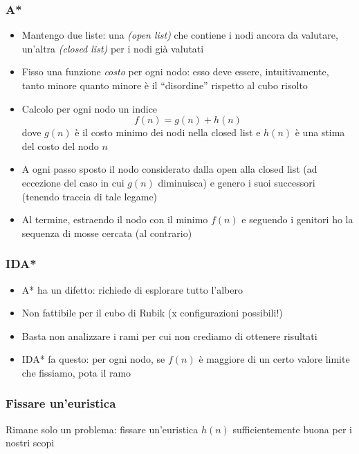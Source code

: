 \documentclass{beamer}
\begin{document}
\begin{frame}
\frametitle{A*}
\begin{itemize}
\item Mantengo due liste: una \emph{(open list)} che contiene i nodi ancora da
valutare, un'altra \emph{(closed list)} per i nodi già valutati
\item Fisso una funzione \emph{costo} per ogni nodo: esso deve essere,
intuitivamente, tanto minore quanto minore è il ``disordine'' rispetto al cubo
risolto
\item Calcolo per ogni nodo un indice
\[
f(n) = g(n) + h(n)
\]
dove $g(n)$ è il costo minimo dei nodi nella closed list e $h(n)$ è una stima
del costo del nodo $n$
\item A ogni passo sposto il nodo considerato dalla open alla closed list (ad
eccezione del caso in cui $g(n)$ diminuisca) e genero i suoi successori
(tenendo traccia di tale legame)
\item Al termine, estraendo il nodo con il minimo $f(n)$ e seguendo i genitori
ho la sequenza di mosse cercata (al contrario)
\end{itemize}
\end{frame}

\begin{frame}
\frametitle{IDA*}
\begin{itemize}
\item A* ha un difetto: richiede di esplorare tutto l'albero
\item Non fattibile per il cubo di Rubik (x configurazioni possibili!)
\item Basta non analizzare i rami per cui non crediamo di ottenere risultati
\item IDA* fa questo: per ogni nodo, se $f(n)$ è maggiore di un certo valore
limite che fissiamo, pota il ramo
\end{itemize}
\end{frame}

\begin{frame}
\frametitle{Fissare un'euristica}
Rimane solo un problema: fissare un'euristica $h(n)$ sufficientemente buona per
i nostri scopi
\end{frame}
\end{document}
